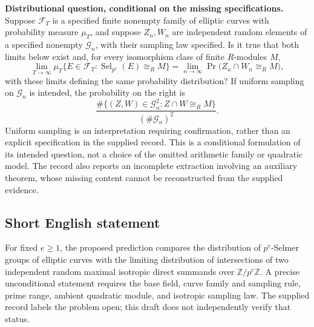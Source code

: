 \documentclass[11pt]{article}
\newcommand{\Z}{\mathbb{Z}}
\begin{document}
\textbf{Distributional question, conditional on the missing specifications.}
Suppose \(\mathcal F_T\) is a specified finite nonempty family of elliptic curves with probability measure \(\mu_T\), and suppose \(Z_n,W_n\) are independent random elements of a specified nonempty \(\mathcal G_n\), with their sampling law specified. Is it true that both limits below exist and, for every isomorphism class of finite \(R\)-modules \(M\),
\[
\lim_{T\to\infty}
\mu_T\bigl\{E\in\mathcal F_T:
\operatorname{Sel}_{p^e}(E)\cong_R M\bigr\}
=
\lim_{n\to\infty}
\Pr\bigl(Z_n\cap W_n\cong_R M\bigr),
\]
with these limits defining the same probability distribution? If uniform sampling on \(\mathcal G_n\) is intended, the probability on the right is
\[
\frac{\#\{(Z,W)\in\mathcal G_n^2:Z\cap W\cong_R M\}}
{(\#\mathcal G_n)^2}.
\]
Uniform sampling is an interpretation requiring confirmation, rather than an explicit specification in the supplied record. This is a conditional formulation of its intended question, not a choice of the omitted arithmetic family or quadratic model. The record also reports an incomplete extraction involving an auxiliary theorem, whose missing content cannot be reconstructed from the supplied evidence.
\subsection{Short English statement}
For fixed \(e\geq1\), the proposed prediction compares the distribution of \(p^e\)-Selmer groups of elliptic curves with the limiting distribution of intersections of two independent random maximal isotropic direct summands over \(\Z/p^e\Z\). A precise unconditional statement requires the base field, curve family and sampling rule, prime range, ambient quadratic module, and isotropic sampling law. The supplied record labels the problem open; this draft does not independently verify that status.
\end{document}
